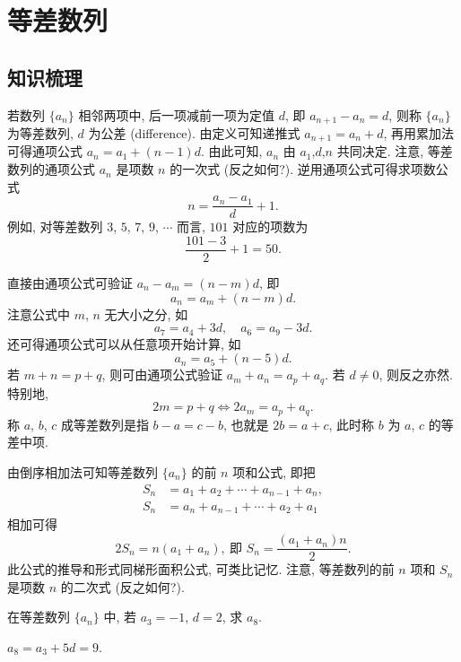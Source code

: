 
\section{等差数列}

\subsection{知识梳理}

若数列 $\{a_n\}$ 相邻两项中, 后一项减前一项为定值 $d$, 即 $a_{n+1}-a_n=d$, 则称 $\{a_n\}$ 为等差数列, $d$ 为公差 (difference). 由定义可知递推式 $a_{n+1}=a_n+d$, 再用累加法可得通项公式 $a_n=a_1+(n-1)d$. 由此可知, $a_n$ 由 $a_1$,$d$,$n$ 共同决定. 注意, 等差数列的通项公式 $a_n$ 是项数 $n$ 的一次式 (反之如何?). 逆用通项公式可得求项数公式
\[n=\frac{a_n-a_1}d+1.\]
例如, 对等差数列 $3$, $5$, $7$, $9$, $\cdots$ 而言, $101$ 对应的项数为
\[\frac{101-3}2+1= 50.\]

直接由通项公式可验证 $a_n-a_m=(n-m)d$, 即 
\[a_n=a_m+(n-m)d.\]
注意公式中 $m$, $n$ 无大小之分, 如
\[a_7= a_4+3d,\quad a_6= a_9-3d.\]
还可得通项公式可以从任意项开始计算, 如
\[a_n= a_5+(n-5)d.\]
若 $m+n=p+q$, 则可由通项公式验证 $a_m+a_n=a_p+a_q$. 若 $d\neq 0$, 则反之亦然. 特别地, 
\[2m=p+q \Leftrightarrow 2a_m=a_p+a_q.\]
称 $a$, $b$, $c$ 成等差数列是指 $b-a=c-b$, 也就是 $2b=a+c$,
此时称 $b$ 为 $a$, $c$ 的等差中项.

由倒序相加法可知等差数列 $\{a_n\}$ 的前 $n$ 项和公式, 即把
\begin{align*}
    S_n&= a_1+a_2+\cdots+a_{n-1}+a_n,\\
    S_n&= a_n+a_{n-1}+\cdots+a_2+a_1
\end{align*}
相加可得
\[2S_n= n(a_1+a_n),\ \text{即\ } S_n=\frac{(a_1+a_n)n}2.\]
此公式的推导和形式同梯形面积公式, 可类比记忆. 注意, 等差数列的前 $n$ 项和 $S_n$ 是项数 $n$ 的二次式 (反之如何?).

\lianxi
\begin{exercise}
    在等差数列 $\{a_n\}$ 中, 若 $a_3=-1$, $d=2$, 求 $a_8$.
\end{exercise}
\beginsolution
    $a_8= a_3+5d= 9$.
\endsolution

